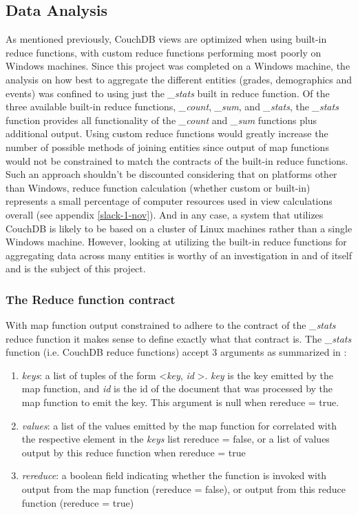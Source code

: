 \subsection{Data Analysis}
As mentioned previously, CouchDB views are optimized when using built-in reduce functions, with custom reduce functions performing most poorly on Windows machines. Since this project was completed on a Windows machine, the analysis on how best to aggregate the different entities (grades, demographics and events) was confined to using just the \textit{\_stats} built in reduce function. Of the three available built-in reduce functions, \textit{\_count}, \textit{\_sum}, and \textit{\_stats}, the \textit{\_stats} function provides all functionality of the \textit{\_count} and \textit{\_sum} functions plus additional output. Using custom reduce functions would greatly increase the number of possible methods of joining entities since output of map functions would not be constrained to match the contracts of the built-in reduce functions. Such an approach shouldn't be discounted considering that on platforms other than Windows, reduce function calculation (whether custom or built-in) represents a small percentage of computer resources used in view calculations overall (see appendix \ref{slack-1-nov}). And in any case, a system that utilizes CouchDB is likely to be based on a cluster of Linux machines rather than a single Windows machine. However, looking at utilizing the built-in reduce functions for aggregating data across many entities is worthy of an investigation in and of itself and is the subject of this project.

\subsubsection{The Reduce function contract}
With map function output constrained to adhere to the contract of the \textit{\_stats} reduce function it makes sense to define exactly what that contract is. The \textit{\_stats} function (i.e. CouchDB reduce functions) accept 3 arguments as summarized in \cite{reduceFunctions}:

\begin{enumerate}
    \item \textit{keys}: a list of tuples of the form \textless \textit{key}, \textit{id} \textgreater. \textit{key} is the key emitted by the map function, and \textit{id} is the id of the document that was processed by the map function to emit the key. This argument is null when rereduce = true.
    \item \textit{values}: a list of the values emitted by the map function for correlated with the respective element in the \textit{keys} list rereduce = false, or a list of values output by this reduce function when rereduce = true
    \item \textit{rereduce}: a boolean field indicating whether the function is invoked with output from the map function (rereduce = false), or output from this reduce function (rereduce = true)
\end{enumerate}

